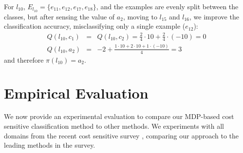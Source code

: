 \documentclass[letterpaper]{article}
\theoremstyle{definition}
\begin{document}
For $l_{10}$, $E_{l_{10}}=\{e_{11},e_{12},e_{17},e_{18} \}$, and the examples are evenly split between the classes, but after sensing the value of $a_2$, moving to $l_{15}$ and $l_{16}$, we improve the classification accuracy, misclassifying only a single example ($e_{12}$):
{\small
\begin{align}
Q(l_{10},c_1) &=& Q(l_{10},c_2) = \frac{2}{4} \cdot 10 + \frac{2}{4} \cdot (-10) = 0\\
Q(l_{10},a_2) &=& -2 + \frac{1 \cdot 10 + 2 \cdot 10 + 1 \cdot (-10)}{4} = 3
\end{align}
}%
and therefore $\pi(l_{10})=a_2$.








\section{Empirical Evaluation}

We now provide an experimental evaluation to compare our MDP-based cost sensitive classification method to other methods. We experiments with all domains from the recent cost sensitive survey \cite{LomaxV13,LomaxV11}, comparing our approach to the leading methods in the survey.
\end{document}
